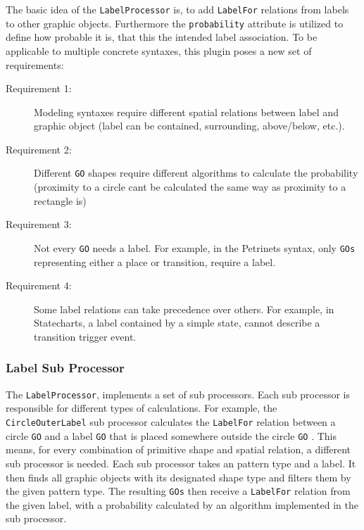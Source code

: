 The basic idea of the \texttt{LabelProcessor} is, to add \texttt{LabelFor} relations from labels to other graphic objects. Furthermore the \texttt{probability} attribute is utilized to define how probable it is, that this the intended label association. To be applicable to multiple concrete syntaxes, this plugin poses a new set of requirements:
\begin{description}
  \item[Requirement 1:] Modeling syntaxes require different spatial relations between label and graphic object (label can be contained, surrounding, above/below, etc.).
  \item[Requirement 2:] Different \texttt{GO} shapes require different algorithms to calculate the probability (proximity to a circle cant be calculated the same way as proximity to a rectangle is)
  \item[Requirement 3:] Not every \texttt{GO} needs a label. For example, in the Petrinets syntax, only \texttt{GOs} representing either a place or transition, require a label.
  \item[Requirement 4:]  Some label relations can take precedence over others. For example, in Statecharts, a label contained by a simple state, cannot describe a transition trigger event.
\end{description}

\subsubsection{Label Sub Processor}
The \texttt{LabelProcessor}, implements a set of sub processors. Each sub processor is responsible for different types of calculations. For example, the \texttt{CircleOuterLabel} sub processor calculates the \texttt{LabelFor} relation between a circle \texttt{GO} and a label \texttt{GO} that is placed somewhere outside the circle \texttt{GO} . This means, for every combination of primitive shape and spatial relation, a different sub processor is needed. Each sub processor takes an pattern type and a label. It then finds all graphic objects with its designated shape type and filters them by the given pattern type. The resulting \texttt{GOs} then receive a \texttt{LabelFor} relation from the given label, with a probability calculated by an algorithm implemented in the sub processor.

